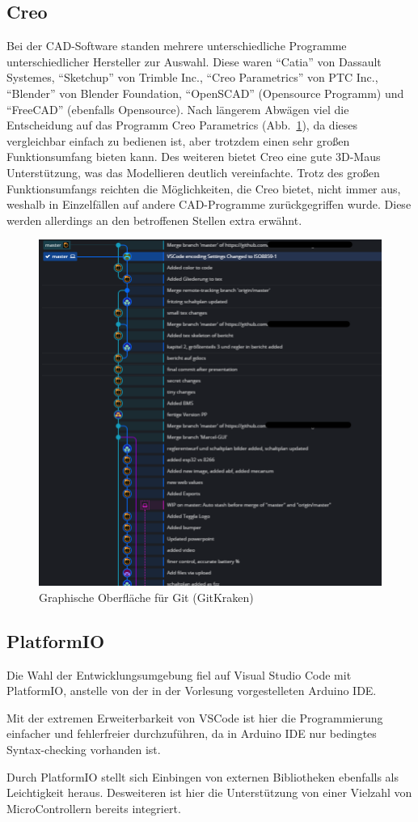 \subsection{Creo}
Bei der CAD-Software standen mehrere unterschiedliche Programme unterschiedlicher Hersteller zur Auswahl.
Diese waren ``Catia'' von Dassault Systemes, ``Sketchup'' von Trimble Inc., ``Creo Parametrics'' von PTC Inc., ``Blender'' von Blender Foundation, ``OpenSCAD'' (Opensource Programm) und ``FreeCAD'' (ebenfalls Opensource).
Nach längerem Abwägen viel die Entscheidung auf das Programm Creo Parametrics (Abb.~\ref{bild:gitkraken}), da dieses vergleichbar einfach zu bedienen ist, aber trotzdem einen sehr großen Funktionsumfang bieten kann.
Des weiteren bietet Creo eine gute 3D-Maus Unterstützung, was das Modellieren deutlich vereinfachte.
Trotz des großen Funktionsumfangs reichten die Möglichkeiten, die Creo bietet, nicht immer aus, weshalb in Einzelfällen auf andere CAD-Programme zurückgegriffen wurde. Diese werden allerdings an den betroffenen Stellen extra erwähnt. 
\begin{figure}[!ht]
	\centering
	\includegraphics[width=\textwidth]{bilder/GitKrakenUebersicht.png}
	\caption{Graphische Oberfläche für Git (GitKraken)}
	\label{bild:gitkraken}
\end{figure}

\subsection{PlatformIO}
Die Wahl der Entwicklungsumgebung fiel auf Visual Studio Code mit PlatformIO, anstelle von der in der Vorlesung vorgestelleten Arduino IDE.

Mit der extremen Erweiterbarkeit von VSCode ist hier die Programmierung einfacher und fehlerfreier durchzuführen, da in Arduino IDE nur bedingtes Syntax-checking vorhanden ist.

Durch PlatformIO stellt sich Einbingen von externen Bibliotheken ebenfalls als Leichtigkeit heraus.
Desweiteren ist hier die Unterstützung von einer Vielzahl von MicroControllern bereits integriert.